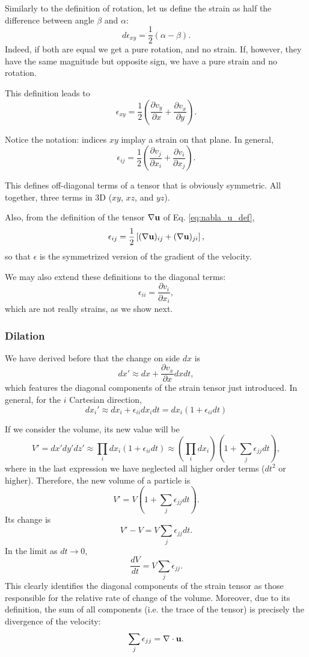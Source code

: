 Similarly to the definition of rotation, let us define the strain as
half the difference between angle $\beta$ and $\alpha$:
\[
d\epsilon_{xy} = \frac12
\left(
        \alpha - \beta
\right) .
\]
Indeed, if both are equal we get a pure rotation, and no strain. If,
however, they have the same magnitude but opposite sign, we have a pure
strain and no rotation.

This definition leads to
\[
\epsilon_{xy} = \frac12
\left(
  \frac{\partial v_y}{\partial x}  +
  \frac{\partial v_x}{\partial y}
\right) .
\]

Notice the notation: indices $xy$ implay a strain on that plane. In general,
\[
\epsilon_{ij} = \frac12
\left(
  \frac{\partial v_j}{\partial x_i}  +
  \frac{\partial v_i}{\partial x_j}
\right) .
\]

This defines off-diagonal terms of a tensor that is obviously
symmetric. All together, three terms in 3D ($xy$, $xz$, and $yz$).

Also, from the definition of the tensor $\nabla \mathbf{u}$ of
Eq. \ref{eq:nabla_u_def},
\begin{equation}
  \label{eq:epsilon_as_grad_u}
  \epsilon_{ij} = \frac12
  \left[
    (\nabla \mathbf{u})_{ij} +
    (\nabla \mathbf{u})_{ji}
  \right] ,
\end{equation}
so that $\epsilon$ is the symmetrized version of the gradient of the
velocity.

We may also extend these definitions to the diagonal terms:
\[
  \epsilon_{ii} =   \frac{\partial v_i}{\partial x_i} ,
\]
which are not really strains, as we show next.

\subsubsection{Dilation}

We have derived before that the change on side $dx$ is
\[
dx' \approx  dx + \frac{\partial v_x}{\partial x} dx dt ,
\]
which features the diagonal components of the strain tensor just
introduced. In general, for the $i$ Cartesian direction,
\[
dx_i' \approx dx_i + \epsilon_{ii} dx_i dt = dx_i
\left(
1+\epsilon_{ii} dt
\right)
\]

If we consider the volume, its new value will be
\[
V'= dx' dy' dz'  \approx  \prod_i  dx_i \left( 1+\epsilon_{ii} dt \right)
\approx \left(\prod_i  dx_i \right) \left( 1 + \sum_j  \epsilon_{jj} dt \right) ,
\]
where in the last expression we have neglected all higher order terms
($dt^2$ or higher). Therefore, the new volume of a particle is
\[
V' = V \left( 1 + \sum_j  \epsilon_{jj} dt \right) .
\]
Its change is
\[
V'-V =  V \sum_j  \epsilon_{jj} dt .
\]
In the limit as $dt\to 0$,
\[
\frac{d V}{dt} = V \sum_j  \epsilon_{jj} .
\]
This clearly identifies the diagonal components of the strain tensor
as those responsible for the relative rate of change of the volume.
Moreover, due to its definition, the sum of all components (i.e. the
trace of the tensor) is precisely the divergence of the velocity:
\[
\sum_j  \epsilon_{jj} = \nabla\cdot \mathbf{u} .
\]

